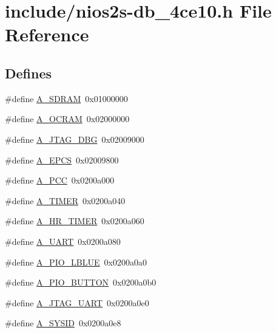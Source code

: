 \hypertarget{nios2s-db__4ce10_8h}{\section{include/nios2s-\/db\-\_\-4ce10.h \-File \-Reference}
\label{nios2s-db__4ce10_8h}
}
\subsection*{\-Defines}
\begin{DoxyCompactItemize}
\item 
\#define \hyperlink{nios2s-db__4ce10_8h_ae16e22cad4f4c749f8cfbbf4e6694613}{\-A\-\_\-\-S\-D\-R\-A\-M}~0x01000000
\item 
\#define \hyperlink{nios2s-db__4ce10_8h_a931fbb6ac1b6a15a7b6965823e86498e}{\-A\-\_\-\-O\-C\-R\-A\-M}~0x02000000
\item 
\#define \hyperlink{nios2s-db__4ce10_8h_abe25df7a188c4b5dda1bb18d8a4b934a}{\-A\-\_\-\-J\-T\-A\-G\-\_\-\-D\-B\-G}~0x02009000
\item 
\#define \hyperlink{nios2s-db__4ce10_8h_a8eadf13f65d74a21635c5a1446b73460}{\-A\-\_\-\-E\-P\-C\-S}~0x02009800
\item 
\#define \hyperlink{nios2s-db__4ce10_8h_ab5ea5dff0f4ec1e5721e3044513ddde0}{\-A\-\_\-\-P\-C\-C}~0x0200a000
\item 
\#define \hyperlink{nios2s-db__4ce10_8h_a7ca7452dfe7689d7cae8ffb69e2a4963}{\-A\-\_\-\-T\-I\-M\-E\-R}~0x0200a040
\item 
\#define \hyperlink{nios2s-db__4ce10_8h_ac69de5a62903279bb796ff8696d2b7ca}{\-A\-\_\-\-H\-R\-\_\-\-T\-I\-M\-E\-R}~0x0200a060
\item 
\#define \hyperlink{nios2s-db__4ce10_8h_afc58b0f18b0e3d72ecab1596b72e7df0}{\-A\-\_\-\-U\-A\-R\-T}~0x0200a080
\item 
\#define \hyperlink{nios2s-db__4ce10_8h_a86b0dfb065bb5fd874085f49c8ac881e}{\-A\-\_\-\-P\-I\-O\-\_\-\-L\-B\-L\-U\-E}~0x0200a0a0
\item 
\#define \hyperlink{nios2s-db__4ce10_8h_a31e8543437aebcaf6b847c56d2e0e721}{\-A\-\_\-\-P\-I\-O\-\_\-\-B\-U\-T\-T\-O\-N}~0x0200a0b0
\item 
\#define \hyperlink{nios2s-db__4ce10_8h_acf05caef6f63efabe8ce9f7b4ab0b40e}{\-A\-\_\-\-J\-T\-A\-G\-\_\-\-U\-A\-R\-T}~0x0200a0e0
\item 
\#define \hyperlink{nios2s-db__4ce10_8h_a7fc6cc4ebdf0f1f60890deac3939e603}{\-A\-\_\-\-S\-Y\-S\-I\-D}~0x0200a0e8
\item 

\end{DoxyCompactItemize}
